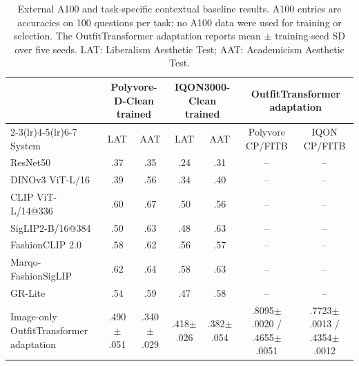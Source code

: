 \begin{table}[t]
\caption{External A100 and task-specific contextual baseline results. A100 entries are accuracies on 100 questions per task; no A100 data were used for training or selection. The OutfitTransformer adaptation reports mean $\pm$ training-seed SD over five seeds. LAT: Liberalism Aesthetic Test; AAT: Academicism Aesthetic Test.}
\label{tab:a100baseline}
\centering
\scriptsize
\setlength{\tabcolsep}{4pt}
\begin{tabular}{lcccccc}
\toprule
& \multicolumn{2}{c}{Polyvore-D-Clean trained} & \multicolumn{2}{c}{IQON3000-Clean trained} & \multicolumn{2}{c}{OutfitTransformer adaptation} \\
\cmidrule(lr){2-3}\cmidrule(lr){4-5}\cmidrule(lr){6-7}
System & LAT & AAT & LAT & AAT & Polyvore CP/FITB & IQON CP/FITB \\
\midrule
ResNet50 & .37 & .35 & .24 & .31 & -- & -- \\
DINOv3 ViT-L/16 & .39 & .56 & .34 & .40 & -- & -- \\
CLIP ViT-L/14@336 & .60 & .67 & .50 & .56 & -- & -- \\
SigLIP2-B/16@384 & .50 & .63 & .48 & .63 & -- & -- \\
FashionCLIP 2.0 & .58 & .62 & .56 & .57 & -- & -- \\
Marqo-FashionSigLIP & .62 & .64 & .58 & .63 & -- & -- \\
GR-Lite & .54 & .59 & .47 & .58 & -- & -- \\
Image-only OutfitTransformer adaptation & .490$\pm$.051 & .340$\pm$.029 & .418$\pm$.026 & .382$\pm$.054 & .8095$\pm$.0020 / .4655$\pm$.0051 & .7723$\pm$.0013 / .4354$\pm$.0012 \\
\bottomrule
\end{tabular}
\end{table}
